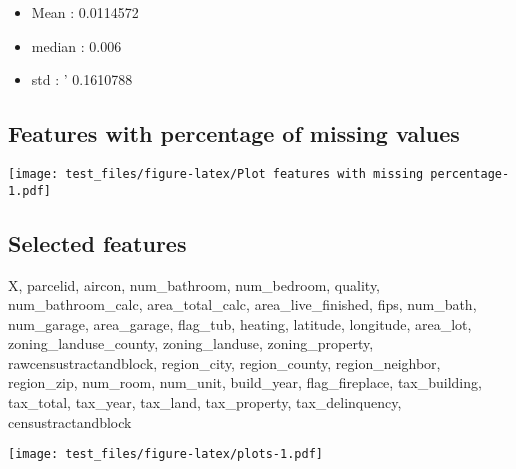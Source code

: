 \documentclass[
]{article}
\providecommand{\tightlist}{%
  \setlength{\itemsep}{0pt}\setlength{\parskip}{0pt}}
\begin{document}
\begin{itemize}
\tightlist
\item
  Mean : 0.0114572
\item
  median : 0.006
\item
  std : ' 0.1610788
\end{itemize}

\hypertarget{features-with-percentage-of-missing-values}{%
\subsection{Features with percentage of missing
values}\label{features-with-percentage-of-missing-values}}

\texttt{[image: test\_files/figure-latex/Plot features with missing percentage-1.pdf]}

\hypertarget{selected-features}{%
\subsection{Selected features}\label{selected-features}}

X, parcelid, aircon, num\_bathroom, num\_bedroom, quality,
num\_bathroom\_calc, area\_total\_calc, area\_live\_finished, fips,
num\_bath, num\_garage, area\_garage, flag\_tub, heating, latitude,
longitude, area\_lot, zoning\_landuse\_county, zoning\_landuse,
zoning\_property, rawcensustractandblock, region\_city, region\_county,
region\_neighbor, region\_zip, num\_room, num\_unit, build\_year,
flag\_fireplace, tax\_building, tax\_total, tax\_year, tax\_land,
tax\_property, tax\_delinquency, censustractandblock

\texttt{[image: test\_files/figure-latex/plots-1.pdf]}
\end{document}
